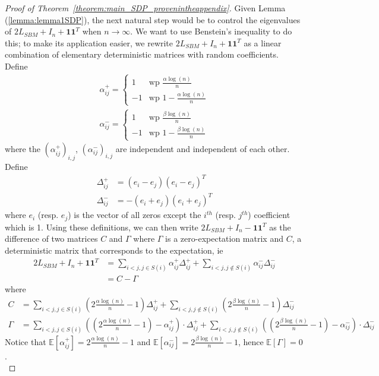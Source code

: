 \documentclass[english]{article}
\newcommand{\1}{\textbf{1}}
\newcommand{\A}{\frac{\alpha \log(n)}{n}}
\newcommand{\B}{\frac{\beta \log(n)}{n}}
\newcommand{\ap}{\alpha^+_{ij}}
\newcommand{\am}{\alpha^-_{ij}}
\newcommand{\E}{\mathbb{E}}
\begin{document}
\begin{proof}[Proof of Theorem~\ref{theorem:main_SDP_provenintheappendix}]


Given Lemma (\ref{lemma:lemma1SDP}), the next natural step would be to control the eigenvalues of $ 2L_{SBM} +I_n + \1\1^T$  when $n \rightarrow \infty$. We want to use Benstein's inequality to do this; to make its application easier, we rewrite $2L_{SBM} +I_n+\1\1^T$ as a linear combination of elementary deterministic matrices with random coefficients.
Define
\begin{align}
\alpha^+_{ij}=\begin{cases} 1 & \text{wp }\A \\ -1 & \text{wp } 1-\A \end{cases}\\
\alpha^-_{ij}=\begin{cases} 1 & \text{wp }\B \\ -1 & \text{wp } 1-\B \end{cases}
\end{align}
where the $(\alpha_{ij}^+)_{i,j}$, $(\alpha_{ij}^-)_{i,j}$  are independent and independent of each other.
Define
\begin{align}
\Delta^+_{ij}&= (e_i-e_j)(e_i-e_j)^T\\
\Delta^-_{ij}&=-(e_i+e_j)(e_i+e_j)^T
\end{align}
where $e_i$ (resp. $e_j$) is the vector of all zeros except the $i^{th}$ (resp. $j^{th}$) coefficient which is 1. 
Using these definitions, we can then write $2L_{SBM} +I_n-\1\1^T$ as the difference of two matrices $C$ and $\Gamma$ where $\Gamma$ is a zero-expectation matrix and $C$, a deterministic matrix that corresponds to the expectation, ie
\begin{align}
2L_{SBM} +I_n+\1\1^T &= \sum_{i<j, j \in S(i)} \alpha^+_{ij} \Delta^+_{ij}+\sum_{i<j, j \notin S(i)} \alpha^-_{ij} \Delta^-_{ij}\\
&= C - \Gamma
\end{align}
where
\begin{align}
C &=  \sum_{i<j, j \in S(i)}\left(2\A-1\right)\Delta^+_{ij}+\sum_{i<j, j \notin S(i)} \left(2\B-1\right) \Delta^-_{ij}\\
\Gamma &=  \sum_{i<j, j \in S(i)}\left(\left(2\A-1\right) - \alpha^{+}_{ij}\right) \cdot \Delta^+_{ij} + \sum_{i<j, j \notin S(i)} \left(\left(2\B-1\right) - \alpha^{-}_{ij}\right) \cdot \Delta^-_{ij}
\end{align}
Notice that $\E[\ap]=2\A-1$ and $\E[\am]=2\B-1$, hence $\E[ \Gamma]=0$.\\


\end{proof}
\end{document}
